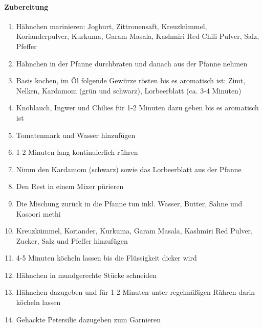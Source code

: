 \paragraph{Zubereitung}
\begin{enumerate}[noitemsep]
	\item Hähnchen marinieren: Joghurt, Zittronensaft, Kreuzkümmel, Korianderpulver, Kurkuma, Garam Masala, Kashmiri Red Chili Pulver, Salz, Pfeffer
	\item Hähnchen in der Pfanne durchbraten und danach aus der Pfanne nehmen
	\item Basis kochen, im Öl folgende Gewürze rösten bis es aromatisch ist: Zimt, Nelken, Kardamom (grün und schwarz), Lorbeerblatt (ca. 3-4 Minuten)
	\item Knoblauch, Ingwer und Chilies für 1-2 Minuten dazu geben bis es aromatisch ist
	\item Tomatenmark und Wasser hinzufügen
	\item 1-2 Minuten lang kontinuierlich rühren
	\item Nimm den Kardamom (schwarz) sowie das Lorbeerblatt aus der Pfanne
	\item Den Rest in einem Mixer pürieren
	\item Die Mischung zurück in die Pfanne tun inkl. Wasser, Butter, Sahne und Kasoori methi
	\item Kreuzkümmel, Koriander, Kurkuma, Garam Masala, Kashmiri Red Pulver, Zucker, Salz und Pfeffer hinzufügen 
	\item 4-5 Minuten köcheln lassen bis die Flüssigkeit dicker wird
	\item Hähnchen in mundgerechte Stücke schneiden
	\item Hähnchen dazugeben und für 1-2 Minuten unter regelmäßigen Rühren darin köcheln lassen
	\item Gehackte Petersilie dazugeben zum Garnieren
\end{enumerate}